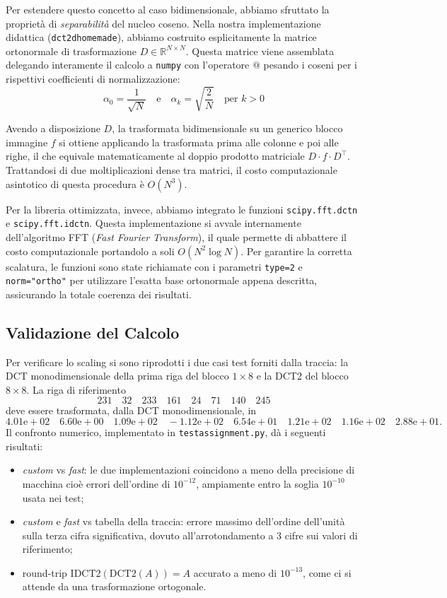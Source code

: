 \documentclass[11pt,a4paper]{article}
\makeatletter
\let\@origtexttt\texttt
\renewcommand{\texttt}[1]{{\def\_{\textunderscore\discretionary{}{}{}}\@origtexttt{#1}}}
\makeatother
\begin{document}
Per estendere questo concetto al caso bidimensionale, abbiamo sfruttato la proprietà di \emph{separabilità} 
del nucleo coseno. Nella nostra implementazione didattica (\texttt{dct\_2d\_homemade}), abbiamo costruito esplicitamente 
la matrice ortonormale di trasformazione $D \in \mathbb{R}^{N \times N}$. Questa matrice viene assemblata delegando 
interamente il calcolo a \texttt{numpy} con l'operatore $@$ pesando i coseni 
per i rispettivi coefficienti di normalizzazione:
\[
\alpha_0 = \frac{1}{\sqrt{N}} \quad \text{e} \quad \alpha_k = \sqrt{\frac{2}{N}} \quad \text{per } k > 0
\]

Avendo a disposizione $D$, la trasformata bidimensionale su un generico blocco immagine $f$ si ottiene applicando 
la trasformata prima alle colonne e poi alle righe, il che equivale matematicamente al doppio prodotto matriciale 
$D \cdot f \cdot D^\top$. Trattandosi di due moltiplicazioni dense tra matrici, il costo computazionale asintotico di
 questa procedura è $O(N^3)$.

Per la libreria ottimizzata, invece, abbiamo integrato le funzioni \texttt{scipy.fft.dctn} e \texttt{scipy.fft.idctn}. 
Questa implementazione si avvale internamente dell'algoritmo FFT (\textit{Fast Fourier Transform}), 
il quale permette di abbattere il costo computazionale portandolo a soli $O(N^2 \log N)$. 
Per garantire la corretta scalatura, le funzioni sono state richiamate con i parametri \texttt{type=2} e 
\texttt{norm="ortho"} per utilizzare l'esatta base ortonormale appena descritta, assicurando la 
totale coerenza dei risultati.

\subsection{Validazione del Calcolo}
Per verificare lo scaling si sono riprodotti i due casi test forniti dalla
traccia: la DCT monodimensionale della prima riga del blocco $1\times 8$ e la
DCT2 del blocco $8\times 8$. La riga di riferimento
\[
231\quad 32\quad 233\quad 161\quad 24\quad 71\quad 140\quad 245
\]
deve essere trasformata, dalla DCT monodimensionale, in
\[
4.01\mathrm{e}{+}02 \quad 6.60\mathrm{e}{+}00 \quad 1.09\mathrm{e}{+}02
\quad -1.12\mathrm{e}{+}02 \quad 6.54\mathrm{e}{+}01 \quad 1.21\mathrm{e}{+}02
\quad 1.16\mathrm{e}{+}02 \quad 2.88\mathrm{e}{+}01.
\]
Il confronto numerico, implementato in \texttt{test\_assignment.py}, dà i
seguenti risultati:
\begin{itemize}
  \item \emph{custom} vs \emph{fast}: le due
        implementazioni coincidono a meno della precisione di macchina cioè errori
        dell'ordine di $10^{-12}$, ampiamente entro la soglia $10^{-10}$ usata
        nei test;
  \item \emph{custom} e \emph{fast} vs tabella della traccia: errore massimo
        dell'ordine dell'unità sulla terza cifra significativa, dovuto
        all'arrotondamento a $3$ cifre sui valori di riferimento;
  \item round-trip $\mathrm{IDCT2}(\mathrm{DCT2}(A)) = A$ accurato a meno di
        $10^{-13}$, come ci si attende da una trasformazione ortogonale.
\end{itemize}
\end{document}
